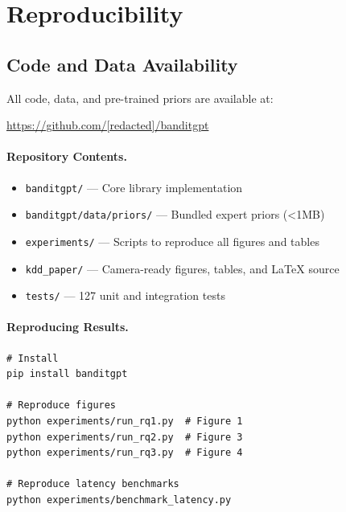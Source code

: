 
\appendix

\section{Reproducibility}
\label{app:reproducibility}

\subsection{Code and Data Availability}

All code, data, and pre-trained priors are available at:

\begin{center}
\url{https://github.com/[redacted]/banditgpt}
\end{center}

\paragraph{Repository Contents.}
\begin{itemize}[leftmargin=*]
    \item \texttt{banditgpt/} --- Core library implementation
    \item \texttt{banditgpt/data/priors/} --- Bundled expert priors (<1MB)
    \item \texttt{experiments/} --- Scripts to reproduce all figures and tables
    \item \texttt{kdd\_paper/} --- Camera-ready figures, tables, and LaTeX source
    \item \texttt{tests/} --- 127 unit and integration tests
\end{itemize}

\paragraph{Reproducing Results.}
{\small
\begin{verbatim}
# Install
pip install banditgpt

# Reproduce figures
python experiments/run_rq1.py  # Figure 1
python experiments/run_rq2.py  # Figure 3
python experiments/run_rq3.py  # Figure 4

# Reproduce latency benchmarks
python experiments/benchmark_latency.py
\end{verbatim}
}


